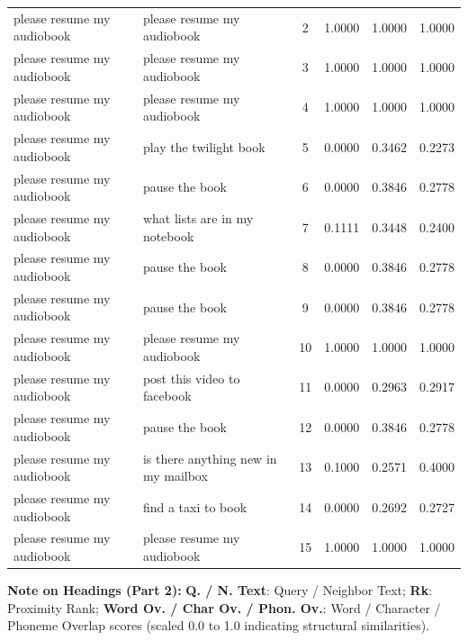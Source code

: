 {\begin{longtable}{p{4.0cm} p{4.0cm} c ccc}
please resume my audiobook & please resume my audiobook & 2 & 1.0000 & 1.0000 & 1.0000 \\
please resume my audiobook & please resume my audiobook & 3 & 1.0000 & 1.0000 & 1.0000 \\
please resume my audiobook & please resume my audiobook & 4 & 1.0000 & 1.0000 & 1.0000 \\
please resume my audiobook & play the twilight book & 5 & 0.0000 & 0.3462 & 0.2273 \\
please resume my audiobook & pause the book & 6 & 0.0000 & 0.3846 & 0.2778 \\
please resume my audiobook & what lists are in my notebook & 7 & 0.1111 & 0.3448 & 0.2400 \\
please resume my audiobook & pause the book & 8 & 0.0000 & 0.3846 & 0.2778 \\
please resume my audiobook & pause the book & 9 & 0.0000 & 0.3846 & 0.2778 \\
please resume my audiobook & please resume my audiobook & 10 & 1.0000 & 1.0000 & 1.0000 \\
please resume my audiobook & post this video to facebook & 11 & 0.0000 & 0.2963 & 0.2917 \\
please resume my audiobook & pause the book & 12 & 0.0000 & 0.3846 & 0.2778 \\
please resume my audiobook & is there anything new in my mailbox & 13 & 0.1000 & 0.2571 & 0.4000 \\
please resume my audiobook & find a taxi to book & 14 & 0.0000 & 0.2692 & 0.2727 \\
please resume my audiobook & please resume my audiobook & 15 & 1.0000 & 1.0000 & 1.0000 \\
\bottomrule
\end{longtable}
}
\vspace{0.1cm}
{\footnotesize\noindent\raggedright \textbf{Note on Headings (Part 2):} \textbf{Q. / N. Text}: Query / Neighbor Text; \textbf{Rk}: Proximity Rank; \textbf{Word Ov. / Char Ov. / Phon. Ov.}: Word / Character / Phoneme Overlap scores (scaled 0.0 to 1.0 indicating structural similarities).\par}

